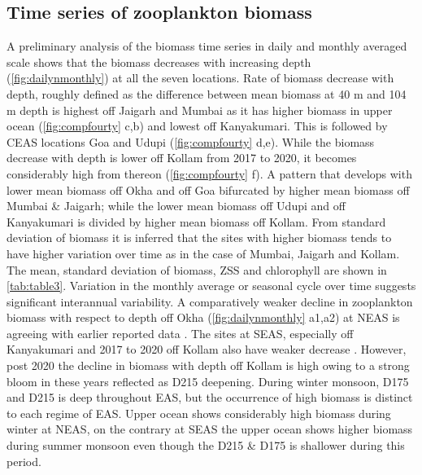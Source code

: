 \documentclass{article}
\begin{document}
	\subsection{Time series of zooplankton biomass}
	A preliminary analysis of the biomass time series in daily and monthly averaged scale shows that the biomass decreases with increasing depth (\cref{fig:dailynmonthly}) at all the seven locations. Rate of biomass decrease with depth, roughly defined as the difference between mean biomass at 40 m  and 104 m depth is highest off Jaigarh and Mumbai as it has higher biomass in upper ocean (\cref{fig:compfourty} c,b) and lowest off Kanyakumari. This is followed by CEAS locations Goa and Udupi (\cref{fig:compfourty} d,e). While the biomass decrease with depth is lower off Kollam from 2017 to 2020, it becomes considerably high from thereon (\cref{fig:compfourty} f). 
	A pattern that develops with lower mean biomass off Okha and off Goa bifurcated by higher mean biomass off Mumbai \& Jaigarh; while the lower mean biomass off Udupi and off Kanyakumari is divided by higher mean biomass off Kollam. From standard deviation of biomass it is inferred that the sites with higher biomass tends to have higher variation over time as in the case of Mumbai, Jaigarh and Kollam. The mean, standard deviation of biomass, ZSS and chlorophyll are shown in \autoref{tab:table3}. Variation in the monthly average or seasonal cycle over time suggests significant interannual variability.	 A comparatively weaker decline in zooplankton biomass with respect to depth off Okha (\cref{fig:dailynmonthly} a1,a2) at NEAS is agreeing with earlier reported data \citep{wishner1998mesozooplankton, madhupratap2001mesozooplankton, smith2005mesozooplankton,jyothibabu2010re}. The sites at SEAS, especially off Kanyakumari and 2017 to 2020 off Kollam also have weaker decrease \citep{madhupratap2001mesozooplankton, jyothibabu2010re, aparna2022seasonal}. However, post 2020 the decline in biomass with depth off Kollam is high owing to a strong bloom in these years reflected as D215 deepening. During winter monsoon, D175 and D215 is deep throughout EAS, but the occurrence of high biomass is distinct to each regime of EAS. Upper ocean shows considerably high biomass during winter at NEAS, on the contrary at SEAS the upper ocean shows higher biomass during summer monsoon even though the D215 \& D175 is shallower during this period. 
	 
\end{document}
